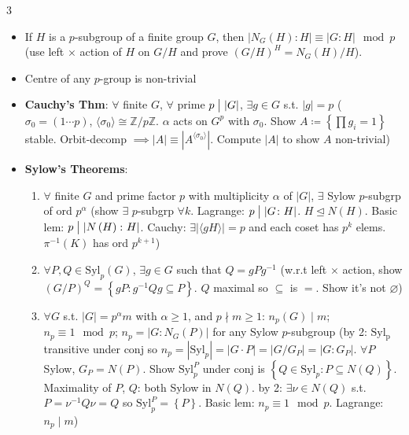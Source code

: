 \documentclass[10pt]{article}
\newcommand{\Z}{\mathbb{Z}} %
\newcommand{\abs}[1]{\left\lvert#1\right\rvert} %
\begin{document}
\begin{multicols*}{3}
\begin{itemize}
            \item If $H$ is a $p$-subgroup of a finite group $G$, then $\abs{N_G\left(H\right) \colon H} \equiv \abs{G \colon H} \mod p$ (use left $\times$ action of $H$ on $G \slash H$ and prove $\left(G \slash H\right)^H = N_G\left(H\right) \slash H$).
            \item Centre of any $p$-group is non-trivial
            \item \textbf{Cauchy's Thm}: $\forall$ finite $G$, $\forall$ prime $p \bigm\vert \abs{G}$, $\exists g \in G$ s.t. $\abs{g} = p$ ($\sigma_0 = \left(1\cdots p\right)$, $\langle\sigma_0\rangle \cong \Z \slash p\Z$. $\alpha$ acts on $G^p$ with $\sigma_0$. Show $A \coloneqq \left\{\prod g_i = 1\right\}$ stable. Orbit-decomp $\implies \abs{A} \equiv \abs{A^{\langle\sigma_0\rangle}}$. Compute $\abs{A}$ to show $A$ non-trivial)
            \item \textbf{Sylow's Theorems}:
            \begin{enumerate}
                \item $\forall$ finite $G$ and prime factor $p$ with multiplicity $\alpha$ of $\abs{G}$, $\exists$ Sylow $p$-subgrp of ord $p^{\alpha}$ (show $\exists$ $p$-subgrp $\forall k$. Lagrange: $p \bigm\vert \abs{G \colon H}$. $H \trianglelefteq N\left(H\right)$. Basic lem: $p \bigm\vert \abs{N\left(H\right) \colon H}$. Cauchy: $\exists\abs{\langle gH\rangle} = p$ and each coset has $p^k$ elems. $\pi^{-1}\left(K\right)$ has ord $p^{k + 1}$)
                \item $\forall P, Q \in \mathrm{Syl}_p\left(G\right)$, $\exists g \in G$ such that $Q = gPg^{-1}$ (w.r.t left $\times$ action, show $\left(G \slash P\right)^Q = \left\{gP \colon g^{-1}Qg \subseteq P\right\}$. $Q$ maximal so $\subseteq$ is $=$. Show it's not $\varnothing$)
                \item $\forall G$ s.t. $\abs{G} = p^{\alpha}m$ with $\alpha \geq 1$, and $p \nmid m \geq 1$: $n_p\left(G\right) \mid m$; $n_p \equiv 1 \mod p$; $n_p = \abs{G \colon N_G\left(P\right)}$ for any Sylow $p$-subgroup (by 2: $\mathrm{Syl_p}$ transitive under conj so $n_p = \abs{\mathrm{Syl}_p} = \abs{G \cdot P} = \abs{G \slash G_P} = \abs{G \colon G_P}$. $\forall P$ Sylow, $G_P = N\left(P\right)$. Show $\mathrm{Syl}_p^P$ under conj is $\left\{Q \in \mathrm{Syl}_p \colon P \subseteq N\left(Q\right)\right\}$. Maximality of $P$, $Q$: both Sylow in $N\left(Q\right)$. by 2: $\exists \nu \in N\left(Q\right)$ s.t. $P = \nu^{-1}Q\nu = Q$ so $\mathrm{Syl}_p^P = \left\{P\right\}$. Basic lem: $n_p \equiv 1 \mod p$. Lagrange: $n_p \mid m$)

\end{enumerate}
\end{itemize}
\end{multicols*}
\end{document}
